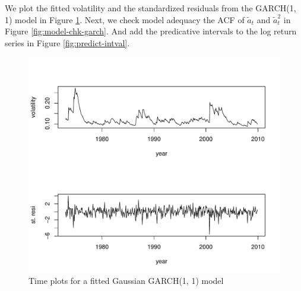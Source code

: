 \documentclass[a4paper,11pt]{article}\usepackage[]{graphicx}\usepackage[]{color}
\makeatletter
\def\maxwidth{ %
  \ifdim\Gin@nat@width>\linewidth
    \linewidth
  \else
    \Gin@nat@width
  \fi
}
\newenvironment{knitrout}{}{} %
\makeatother
\begin{document}
We plot the fitted volatility and the standardized residuals from the GARCH(1, 1) model in Figure \ref{fig:plot-garch}. Next, we check model adequacy the ACF of {$\tilde{a}_t$} and {$\tilde{a}^2_t$} in Figure \ref{fig:model-chk-garch}. And add the predicative intervals to the log return series in Figure \ref{fig:predict-intval}.



\begin{knitrout}
\color{fgcolor}\begin{figure}
\includegraphics[width=\maxwidth]{figure/plot-garch-1} \caption[Time plots for a fitted Gaussian GARCH(1, 1) model]{Time plots for a fitted Gaussian GARCH(1, 1) model}\label{fig:plot-garch}
\end{figure}


\end{knitrout}
\end{document}
